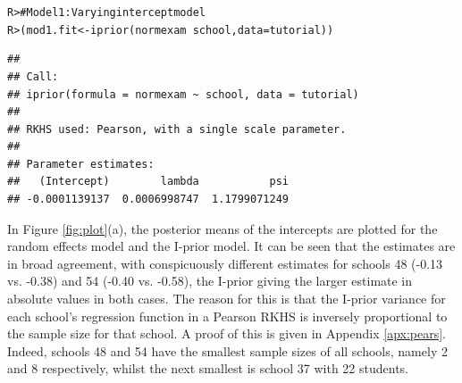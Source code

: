 \documentclass[a4paper,showframe,11pt]{report}\usepackage[]{graphicx}\usepackage[]{color}
\makeatletter
\newcommand{\hlcom}[1]{\textcolor[rgb]{0.588,0.588,0.588}{#1}}%
\newcommand{\hlopt}[1]{\textcolor[rgb]{0.196,0.196,0.196}{#1}}%
\newcommand{\hlstd}[1]{\textcolor[rgb]{0.196,0.196,0.196}{#1}}%
\newcommand{\hlkwb}[1]{\textcolor[rgb]{0.627,0,0.314}{#1}}%
\newcommand{\hlkwc}[1]{\textcolor[rgb]{0,0.631,0.314}{#1}}%
\newcommand{\hlkwd}[1]{\textcolor[rgb]{0.78,0.227,0.412}{#1}}%
\newenvironment{kframe}{%
 \def\at@end@of@kframe{}%
 \ifinner\ifhmode%
  \def\at@end@of@kframe{\end{minipage}}%
  \begin{minipage}{\columnwidth}%
 \fi\fi%
 \def\FrameCommand##1{\hskip\@totalleftmargin \hskip-\fboxsep
 \colorbox{shadecolor}{##1}\hskip-\fboxsep
     \hskip-\linewidth \hskip-\@totalleftmargin \hskip\columnwidth}%
 \MakeFramed {\advance\hsize-\width
   \@totalleftmargin\z@ \linewidth\hsize
   \@setminipage}}%
 {\par\unskip\endMakeFramed%
 \at@end@of@kframe}
\newenvironment{knitrout}{}{} %
\makeatother
\begin{document}
\begin{knitrout}
\color{fgcolor}\begin{kframe}
\begin{alltt}
\hlstd{R> }\hlcom{# Model 1: Varying intercept model}
\hlstd{R> }\hlstd{(mod1.fit} \hlkwb{<-} \hlkwd{iprior}\hlstd{(normexam} \hlopt{~} \hlstd{school,} \hlkwc{data} \hlstd{= tutorial))}
\end{alltt}
\end{kframe}
\end{knitrout}
\begin{knitrout}
\color{fgcolor}\begin{kframe}
\begin{verbatim}
## 
## Call:
## iprior(formula = normexam ~ school, data = tutorial)
## 
## RKHS used: Pearson, with a single scale parameter.
## 
## Parameter estimates:
##   (Intercept)        lambda           psi 
## -0.0001139137  0.0006998747  1.1799071249
\end{verbatim}
\end{kframe}
\end{knitrout}

In Figure \ref{fig:plot}(a), the posterior means of the intercepts are plotted for the random effects model and the I-prior model. It can be seen that the estimates are in broad agreement, with conspicuously different estimates for schools 48 (-0.13 vs. -0.38) and 54 (-0.40 vs. -0.58), the I-prior giving the larger estimate in absolute values in both cases. The reason for this is that the I-prior variance for each school's regression function in a Pearson RKHS is inversely proportional to the sample size for that school. A proof of this is given in Appendix \ref{apx:pears}. Indeed, schools 48 and 54 have the smallest sample sizes of all schools, namely 2 and 8 respectively, whilst the next smallest is school 37 with 22 students.
\end{document}
